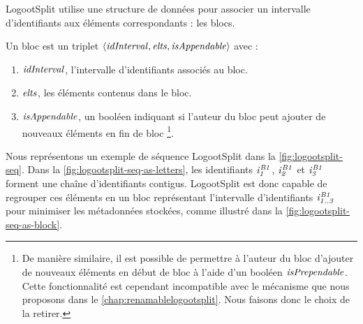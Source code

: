 


LogootSplit utilise une structure de données pour associer un intervalle d'identifiants aux éléments correspondants : les blocs.

\begin{definition}[Bloc]
  Un bloc est un triplet $\langle \mathit{idInterval}, \mathit{elts}, \mathit{isAppendable} \rangle$ avec :
  \begin{enumerate}
    \item $\mathit{idInterval}$, l'intervalle d'identifiants associés au bloc.
    \item $\mathit{elts}$, les éléments contenus dans le bloc.
    \item $\mathit{isAppendable}$, un booléen indiquant si l'auteur du bloc peut ajouter de nouveaux éléments en fin de bloc
    \footnote{
      De manière similaire, il est possible de permettre à l'auteur du bloc d'ajouter de nouveaux éléments en début de bloc à l'aide d'un booléen $\mathit{isPrependable}$.
      Cette fonctionnalité est cependant incompatible avec le mécanisme que nous proposons dans le \autoref{chap:renamablelogootsplit}.
      Nous faisons donc le choix de la retirer.
    }.
  \end{enumerate}
\end{definition}

Nous représentons un exemple de séquence LogootSplit dans la \autoref{fig:logootsplit-seq}.
Dans la \autoref{fig:logootsplit-seq-as-letters}, les identifiants $\mathit{i}^{\mathit{B1}}_{\mathit{1}}$, $\mathit{i}^{\mathit{B1}}_{\mathit{2}}$ et $\mathit{i}^{\mathit{B1}}_{\mathit{3}}$ forment une chaîne d'identifiants contigus.
LogootSplit est donc capable de regrouper ces éléments en un bloc représentant l'intervalle d'identifiants $\mathit{i}^{\mathit{B1}}_{\mathit{1..3}}$ pour minimiser les métadonnées stockées, comme illustré dans la \autoref{fig:logootsplit-seq-as-block}.


